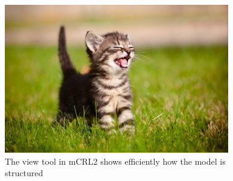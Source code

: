\begin{figure}[!h]
	\includegraphics[width=\linewidth]{view}
	\caption{The view tool in mCRL2 shows efficiently how the model is structured}
	\label{fig:view}
\end{figure}


